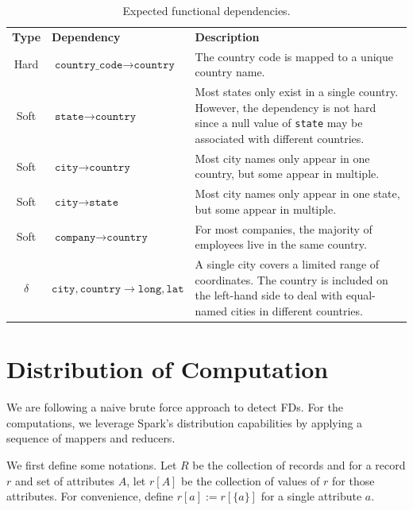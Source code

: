 \documentclass{article}
\begin{document}
    \begin{table}[ht]
        \centering
        \begin{tabular}{|c|l|p{8cm}|}
            \hline
            \textbf{Type} & \textbf{Dependency} & \textbf{Description} \\
            \Xhline{2\arrayrulewidth}
            Hard & $\texttt{country\_code} \rightarrow \texttt{country}$ & The country code is mapped to a unique country name.\\
            \hline
            Soft & $\texttt{state} \rightarrow \texttt{country}$ & Most states only exist in a single country. However, the dependency is not hard since a null value of \texttt{state} may be associated with different countries.\\
            \hline
            Soft & $\texttt{city} \rightarrow \texttt{country}$ & Most city names only appear in one country, but some appear in multiple.\\
            \hline
            Soft & $\texttt{city} \rightarrow \texttt{state}$ & Most city names only appear in one state, but some appear in multiple.\\
            \hline
            Soft & $\texttt{company} \rightarrow \texttt{country}$ & For most companies, the majority of employees live in the same country.\\
            \hline
            $\delta$ & $\texttt{city}, \texttt{country} \rightarrow \texttt{long}, \texttt{lat}$ & A single city covers a limited range of coordinates. The country is included on the left-hand side to deal with equal-named cities in different countries.\\
            \hline
        \end{tabular}
        \caption{Expected functional dependencies.}
        \label{tab:expected-fds}
    \end{table}

\section{Distribution of Computation}\label{sec:distribution}

    We are following a naive brute force approach to detect FDs. For the computations, we leverage Spark's distribution capabilities by applying a sequence of mappers and reducers.
    
    We first define some notations. Let $R$ be the collection of records and for a record $r$ and set of attributes $A$, let $r[A]$ be the collection of values of $r$ for those attributes. For convenience, define $r[a] := r[\{a\}]$ for a single attribute $a$.
    
\end{document}
